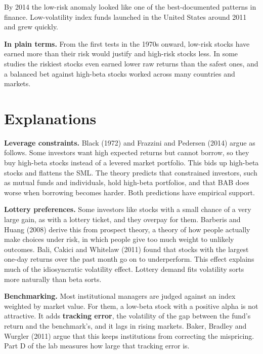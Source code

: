 By 2014 the low-risk anomaly looked like one of the best-documented patterns in finance. Low-volatility index funds launched in the United States around 2011 and grew quickly.

\noindent\textbf{In plain terms.} From the first tests in the 1970s onward, low-risk stocks have earned more than their risk would justify and high-risk stocks less. In some studies the riskiest stocks even earned lower raw returns than the safest ones, and a balanced bet against high-beta stocks worked across many countries and markets.

\section{Explanations}
\label{sec:18-explanations}

\textbf{Leverage constraints.} Black (1972) and Frazzini and Pedersen (2014) argue as follows. Some investors want high expected returns but cannot borrow, so they buy high-beta stocks instead of a levered market portfolio. This bids up high-beta stocks and flattens the SML. The theory predicts that constrained investors, such as mutual funds and individuals, hold high-beta portfolios, and that BAB does worse when borrowing becomes harder. Both predictions have empirical support.

\textbf{Lottery preferences.} Some investors like stocks with a small chance of a very large gain, as with a lottery ticket, and they overpay for them. Barberis and Huang (2008) derive this from prospect theory, a theory of how people actually make choices under risk, in which people give too much weight to unlikely outcomes. Bali, Cakici and Whitelaw (2011) found that stocks with the largest one-day returns over the past month go on to underperform. This effect explains much of the idiosyncratic volatility effect. Lottery demand fits volatility sorts more naturally than beta sorts.

\textbf{Benchmarking.} Most institutional managers are judged against an index weighted by market value. For them, a low-beta stock with a positive alpha is not attractive. It adds \textbf{tracking error}, the volatility of the gap between the fund's return and the benchmark's, and it lags in rising markets. Baker, Bradley and Wurgler (2011) argue that this keeps institutions from correcting the mispricing. Part D of the lab measures how large that tracking error is.

